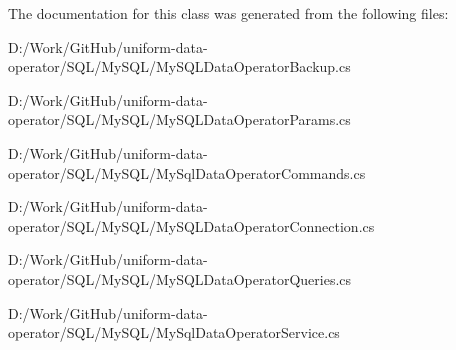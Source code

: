 The documentation for this class was generated from the following files\+:\begin{DoxyCompactItemize}
\item 
D\+:/\+Work/\+Git\+Hub/uniform-\/data-\/operator/\+S\+Q\+L/\+My\+S\+Q\+L/My\+S\+Q\+L\+Data\+Operator\+Backup.\+cs\item 
D\+:/\+Work/\+Git\+Hub/uniform-\/data-\/operator/\+S\+Q\+L/\+My\+S\+Q\+L/My\+S\+Q\+L\+Data\+Operator\+Params.\+cs\item 
D\+:/\+Work/\+Git\+Hub/uniform-\/data-\/operator/\+S\+Q\+L/\+My\+S\+Q\+L/My\+Sql\+Data\+Operator\+Commands.\+cs\item 
D\+:/\+Work/\+Git\+Hub/uniform-\/data-\/operator/\+S\+Q\+L/\+My\+S\+Q\+L/My\+S\+Q\+L\+Data\+Operator\+Connection.\+cs\item 
D\+:/\+Work/\+Git\+Hub/uniform-\/data-\/operator/\+S\+Q\+L/\+My\+S\+Q\+L/My\+S\+Q\+L\+Data\+Operator\+Queries.\+cs\item 
D\+:/\+Work/\+Git\+Hub/uniform-\/data-\/operator/\+S\+Q\+L/\+My\+S\+Q\+L/My\+Sql\+Data\+Operator\+Service.\+cs\end{DoxyCompactItemize}
